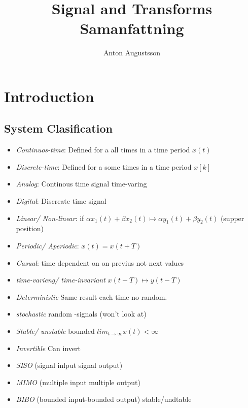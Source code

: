 \documentclass{article}
\title{Signal and Transforms Samanfattning}
\author{Anton Augustsson}
\begin{document}
\maketitle
\newpage
\tableofcontents
\newpage

\section{Introduction}
\subsection{System Clasification}

\begin{itemize}
    \item \textit{Continuos-time}: Defined for a all times in a time period $x(t)$
    \item \textit{Discrete-time}: Defined for a some times in a time period $x[k]$
    \item \textit{Analog}: Continous time signal time-varing 
    \item \textit{Digital}: Discreate time signal
    \item \textit{Linear/ Non-linear}: if $\alpha x_1(t) + \beta x_2(t) \mapsto \alpha y_1(t) + \beta y_2(t)$ (supper position)
    \item \textit{Periodic/ Aperiodic}: $x(t)=x(t+T)$
    \item \textit{Casual}: time dependent on on previus not next values
    \item \textit{time-varieng/ time-invariant} $x(t-T) \mapsto y(t-T)$
    \item \textit{Deterministic} Same result each time no random.
    \item \textit{stochastic} random -signals (won't look at)
    \item \textit{Stable/ unstable}  bounded $lim_{t\to\infty} x(t) < \infty$
    \item \textit{Invertible} Can invert
    \item \textit{SISO} (signal inlput signal output)
    \item \textit{MIMO} (multiple input multiple output)
    \item \textit{BIBO} (bounded input-bounded output) stable/undtable
\end{itemize}
\end{document}
